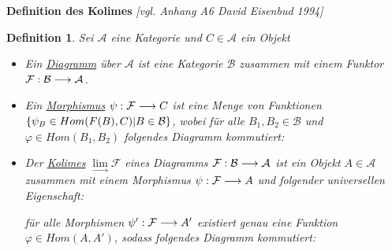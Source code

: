 \documentclass[10pt,a4paper]{report}
\newcommand{\comment}[1]{}
\newcommand{\ModulsOfDifferenzials}{David Eisenbud 1994}
\newcounter{Aussage}[chapter]
\newtheorem{definition}[Aussage]{Definition}
\newcommand{\functionfront}[3]{\nolinebreak{#1:#2 \longrightarrow #3}}
\newcommand{\colimes}[0]{\lim\limits_{ \longrightarrow }}
\begin{document}
\textbf{Definition des Kolimes} \textit{[vgl. Anhang A6 \ModulsOfDifferenzials]}
\begin{definition}\comment{\label{Definition des Kolimes}}
Sei $\mathcal{A}$ eine Kategorie und $C \in \mathcal{A}$ ein Objekt
\begin{itemize}
\item Ein \underline{Diagramm} über $\mathcal{A}$ ist eine Kategorie $\mathcal{B}$ zusammen mit einem Funktor $\functionfront{\mathcal{F}}{\mathcal{B}}{\mathcal{A}}$.
\item Ein \underline{Morphismus} $\functionfront{\psi}{\mathcal{F}}{C}$ ist eine Menge von Funktionen 
$\nolinebreak{\lbrace \psi_B \in Hom(F(B),C) \vert B \in \mathcal{B} \rbrace}$, wobei für alle $B_1,B_2 \in \mathcal{B}$ und $\varphi \in Hom(B_1,B_2)$ folgendes Diagramm kommutiert:
\begin{center}
\end{center}
\item Der \underline{Kolimes} $\colimes \mathcal{F}$ eines Diagramms $\functionfront{\mathcal{F}}{\mathcal{B}}{\mathcal{A}}$ ist ein Objekt $A \in \mathcal{A}$ zusammen mit einem Morphismus $\functionfront{\psi}{\mathcal{F}}{A}$ und folgender universellen Eigenschaft:
\begin{center}
\comment{$\forall Morphismen \functionfront{\psi '}{\mathcal{F}}{\mathcal{A}'}\exists ! \varphi \in Hom_{\mathcal{A}}(A,A') \forall B \in \mathcal{B}: \varphi \circ \psi_B = \psi'_B $}

für alle Morphismen $\functionfront{\psi '}{\mathcal{F}}{A'}$ existiert genau eine Funktion $\varphi \in Hom(A,A')$, sodass folgendes Diagramm kommutiert:
\end{center}
\end{itemize}
\end{definition}
\end{document}
